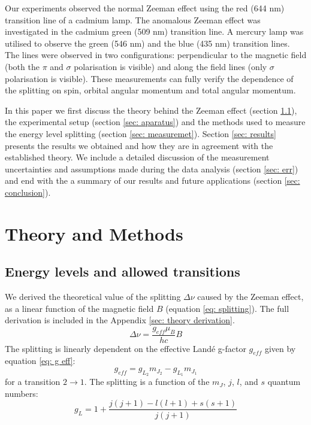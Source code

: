 \documentclass[11pt]{article}
\begin{document}
Our experiments observed the normal Zeeman effect using the red (644 nm) transition line of a cadmium lamp. The anomalous Zeeman effect was investigated in the cadmium green (509  nm) transition line. A mercury lamp was utilised to observe the green (546 nm) and the blue (435 nm) transition lines. The lines were observed in two configurations: perpendicular to the magnetic field (both the $\pi$ and $\sigma$ polarisation is visible) and along the field lines (only $\sigma$ polarisation is visible). These measurements can fully verify the dependence of the splitting on spin, orbital angular momentum and total angular momentum. 

In this paper we first discuss the theory behind the Zeeman effect (section \ref{sec: theory}), the experimental setup (section \ref{sec: aparatus}) and the methods used to measure the energy level splitting (section \ref{sec: measuremet}). Section \ref{sec: results} presents the results we obtained and how they are in agreement with the established theory. We include a detailed discussion of the measurement uncertainties and assumptions made during the data analysis (section \ref{sec: err}) and end with the a summary of our results and future applications (section \ref{sec: conclusion}). 


\section{Theory and Methods}
\subsection{Energy levels and allowed transitions} \label{sec: theory}
We derived the theoretical value of the splitting $\Delta \nu $ caused by the Zeeman effect, as a linear function of the magnetic field $B$ (equation \eqref{eq: splitting}). The full derivation is included in the Appendix \ref{sec: theory derivation}. 
\begin{equation}
    \Delta \nu = \frac{g_{eff} \mu_B}{hc} B \label{eq: splitting}
\end{equation}
The splitting is linearly dependent on the effective Landé g-factor $g_{eff}$ given by equation \eqref{eq: g eff}: 
\begin{equation}
    g_{eff} = g_{L_2} m_{J_2} - g_{L_1} m_{J_1} \label{eq: g eff}
\end{equation}
for a transition $2 \rightarrow 1$. The splitting is a function of the $m_J$, $j$, $l$, and $s$ quantum numbers: 
\begin{equation}
    g_L = 1 + \frac{j(j+1)-l(l+1) +s(s+1)}{j(j+1)} \label{eq: gl}
\end{equation}
\end{document}
